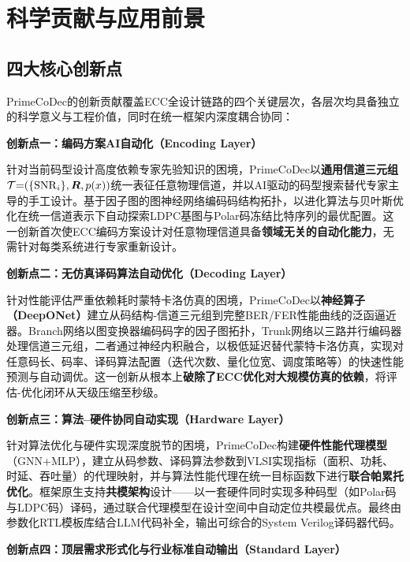 ﻿\section{科学贡献与应用前景}\label{sec:contribution}

\subsection{四大核心创新点}

PrimeCoDec的创新贡献覆盖ECC全设计链路的四个关键层次，各层次均具备独立的科学意义与工程价值，同时在统一框架内深度耦合协同：

\vspace{4pt}
\textbf{创新点一：编码方案AI自动化（Encoding Layer）}

针对当前码型设计高度依赖专家先验知识的困境，PrimeCoDec以\textbf{通用信道三元组}$\mathcal{T}{=}(\{\mathrm{SNR}_i\},\bm{R},p(x))$统一表征任意物理信道，并以AI驱动的码型搜索替代专家主导的手工设计。基于因子图的图神经网络编码码结构拓扑，以进化算法与贝叶斯优化在统一信道表示下自动探索LDPC基图与Polar码冻结比特序列的最优配置。这一创新首次使ECC编码方案设计对任意物理信道具备\textbf{领域无关的自动化能力}，无需针对每类系统进行专家重新设计。

\vspace{4pt}
\textbf{创新点二：无仿真译码算法自动优化（Decoding Layer）}

针对性能评估严重依赖耗时蒙特卡洛仿真的困境，PrimeCoDec以\textbf{神经算子（DeepONet）}建立从码结构-信道三元组到完整BER/FER性能曲线的泛函逼近器。Branch网络以图变换器编码码字的因子图拓扑，Trunk网络以三路并行编码器处理信道三元组，二者通过神经内积融合，以极低延迟替代蒙特卡洛仿真，实现对任意码长、码率、译码算法配置（迭代次数、量化位宽、调度策略等）的快速性能预测与自动调优。这一创新从根本上\textbf{破除了ECC优化对大规模仿真的依赖}，将评估-优化闭环从天级压缩至秒级。

\vspace{4pt}
\textbf{创新点三：算法--硬件协同自动实现（Hardware Layer）}

针对算法优化与硬件实现深度脱节的困境，PrimeCoDec构建\textbf{硬件性能代理模型}（GNN+MLP），建立从码参数、译码算法参数到VLSI实现指标（面积、功耗、时延、吞吐量）的代理映射，并与算法性能代理在统一目标函数下进行\textbf{联合帕累托优化}。框架原生支持\textbf{共模架构}设计——以一套硬件同时实现多种码型（如Polar码与LDPC码）译码，通过联合代理模型在设计空间中自动定位共模最优点。最终由参数化RTL模板库结合LLM代码补全，输出可综合的System Verilog译码器代码。

\vspace{4pt}
\textbf{创新点四：顶层需求形式化与行业标准自动输出（Standard Layer）}

